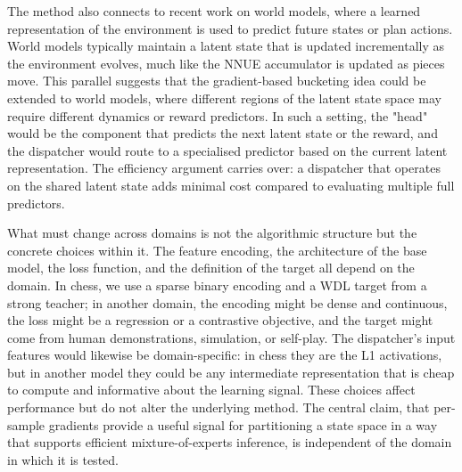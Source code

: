 The method also connects to recent work on world models, where a learned representation of the environment is used to predict future states or plan actions. World models typically maintain a latent state that is updated incrementally as the environment evolves, much like the NNUE accumulator is updated as pieces move. This parallel suggests that the gradient-based bucketing idea could be extended to world models, where different regions of the latent state space may require different dynamics or reward predictors. In such a setting, the "head" would be the component that predicts the next latent state or the reward, and the dispatcher would route to a specialised predictor based on the current latent representation. The efficiency argument carries over: a dispatcher that operates on the shared latent state adds minimal cost compared to evaluating multiple full predictors.


What must change across domains is not the algorithmic structure but the concrete choices within it. The feature encoding, the architecture of the base model, the loss function, and the definition of the target all depend on the domain. In chess, we use a sparse binary encoding and a WDL target from a strong teacher; in another domain, the encoding might be dense and continuous, the loss might be a regression or a contrastive objective, and the target might come from human demonstrations, simulation, or self-play. The dispatcher's input features would likewise be domain-specific: in chess they are the L1 activations, but in another model they could be any intermediate representation that is cheap to compute and informative about the learning signal. These choices affect performance but do not alter the underlying method. The central claim, that per-sample gradients provide a useful signal for partitioning a state space in a way that supports efficient mixture-of-experts inference, is independent of the domain in which it is tested.





